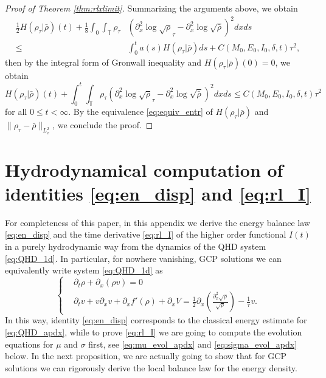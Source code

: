 \documentclass[leqno]{amsart}
\theoremstyle{plain}
\theoremstyle{definition}
\theoremstyle{remark}
\theoremstyle{plain}
\theoremstyle{plain}
\def\T{{\mathbb T}}%
\def\d{{\partial}}
\numberwithin{equation}{section}
\begin{document}
\begin{proof}[Proof of Theorem \ref{thm:rlxlimit}]
Summarizing the arguments above, we obtain
\begin{align*}
\frac12H(\rho_\tau|\bar\rho)(t)+\frac18\int_0\int_\T\rho_\tau &(\d_x^2\log\sqrt\rho_\tau-\d_x^2\log\sqrt{\bar\rho})^2dxds\\
\leq & \int_0^t a(s)H(\rho_\tau|\bar\rho)ds+C(M_0,E_0,I_0,\delta,t)\tau^2,
\end{align*}
then by the integral form of Gronwall inequality and $H(\rho_\tau|\bar\rho)(0)=0$, we obtain
\[
H(\rho_\tau|\bar\rho)(t)+\int_0^t\int_\T\rho_\tau (\d_x^2\log\sqrt\rho_\tau-\d_x^2\log\sqrt{\bar\rho})^2dxds\leq C(M_0,E_0,I_0,\delta,t)\tau^2
\]
for all $0\leq t<\infty$. By the equivalence \eqref{eq:equiv_entr} of $H(\rho_\tau|\bar\rho)$ and $\|\rho_\tau-\bar\rho\|_{L^2_x}$, we conclude the proof.
\end{proof}

\appendix

\section{Hydrodynamical computation of identities \eqref{eq:en_disp} and \eqref{eq:rl_I}}

For completeness of this paper, in this appendix we derive the energy balance law \eqref{eq:en_disp} and the time derivative \eqref{eq:rl_I} of the higher order functional $I(t)$ in a purely hydrodynamic way from the dynamics of the QHD system \eqref{eq:QHD_1d}.
In particular, for nowhere vanishing, GCP solutions we can equivalently write system \eqref{eq:QHD_1d} as
\begin{equation}\label{eq:QHD_apdx}
\left\{\begin{aligned}
&\d_t\rho +\d_x(\rho  v )=0\\
&\d_tv + v \d_xv +\d_xf'(\rho )+\d_x V 
=\frac12\d_x\left(\frac{\d_x^2\sqrt{\rho }}{\sqrt{\rho }}\right)-\frac{1}{\tau}v. 
\end{aligned}\right.
\end{equation}
In this way, identity \eqref{eq:en_disp} corresponds to the classical energy estimate for \eqref{eq:QHD_apdx}, while to prove \eqref{eq:rl_I} we are going to compute the evolution equations for $\mu$ and $\sigma$ first, see \eqref{eq:mu_evol_apdx} and \eqref{eq:sigma_evol_apdx} below.
\newline
In the next proposition, we are actually going to show that for GCP solutions we can rigorously derive the local balance law for the energy density.
\end{document}

